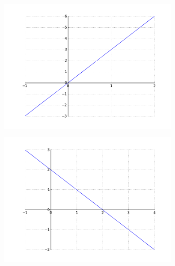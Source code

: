 \documentclass[12pt,twoside,onecolumn]{article}
\begin{document}
\begin{figure}[h!]
\centering
    \begin{subfigure}{.5\textwidth}
    \centering
    \includegraphics[scale = 0.5]{figures/3X.png}
    \end{subfigure}%
    \begin{subfigure}{.5\textwidth}
    \centering
    \includegraphics[scale = 0.5]{figures/mXp2.png}
    \end{subfigure}
    \begin{subfigure}{.5\textwidth}
    \centering

\end{subfigure}
\end{figure}
\end{document}
